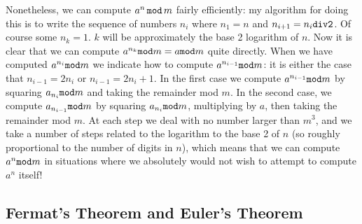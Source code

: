 \documentclass[12pt]{article}
\begin{document}
Nonetheless, we can compute $a^n\,{\tt mod}\,m$ fairly efficiently:   my algorithm for doing this is to write the sequence of numbers $n_i$ where $n_1=n$ and $n_{i+1}=n_i{\tt div 2}$.   Of course some $n_k=1$.   $k$ will be approximately the base 2 logarithm of $n$.   Now it is clear that we can compute $a^{n_k}{\tt mod}m=a{\tt mod}m$ quite directly.   When we have computed $a^{n_i}{\tt mod}m$ we indicate how to compute $a^{n_{i-1}}{\tt mod}m$:   it is either the case that $n_{i-1}=2n_i$ or $n_{i-1}=2n_i+1$.
In the first case we compute $a^{n_{i-1}}{\tt mod}m$ by squaring $a_{n_i}{\tt mod}m$ and taking the remainder mod $m$.   In the second case, we compute $a_{n_{i-1}}{\tt mod}m$ by squaring $a_{n_i}{\tt mod}m$, multiplying by $a$, then taking the remainder mod $m$.  At each step we deal with no number larger than $m^3$, and we take a number of steps related to the logarithm to the base 2 of $n$ (so roughly proportional to the number of digits in $n$), which means that we can compute $a^n{\tt mod}m$ in situations where
we absolutely would not wish to attempt to compute $a^n$ itself!

\subsection{Fermat's Theorem and Euler's Theorem}
\end{document}
